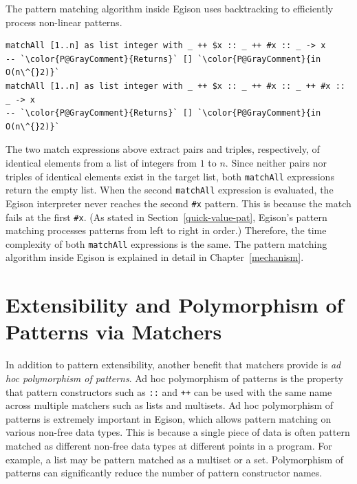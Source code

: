 The pattern matching algorithm inside Egison uses backtracking to efficiently process non-linear patterns.
\begin{lstlisting}[language=egison,numbers=none]
matchAll [1..n] as list integer with _ ++ $x :: _ ++ #x :: _ -> x
-- `\color{P@GrayComment}{Returns}` [] `\color{P@GrayComment}{in O(n\^{}2)}`
matchAll [1..n] as list integer with _ ++ $x :: _ ++ #x :: _ ++ #x :: _ -> x
-- `\color{P@GrayComment}{Returns}` [] `\color{P@GrayComment}{in O(n\^{}2)}`
\end{lstlisting}
The two match expressions above extract pairs and triples, respectively, of identical elements from a list of integers from $1$ to $n$.
Since neither pairs nor triples of identical elements exist in the target list, both \lstinline{matchAll} expressions return the empty list.
When the second \lstinline{matchAll} expression is evaluated, the Egison interpreter never reaches the second \lstinline|#x| pattern.
This is because the match fails at the first \lstinline|#x|.
(As stated in Section~\ref{quick-value-pat}, Egison's pattern matching processes patterns from left to right in order.)
Therefore, the time complexity of both \lstinline{matchAll} expressions is the same.
The pattern matching algorithm inside Egison is explained in detail in Chapter~\ref{mechanism}.

\section{Extensibility and Polymorphism of Patterns via Matchers}\label{quick-matcher}

In addition to pattern extensibility, another benefit that matchers provide is \emph{ad hoc polymorphism of patterns}.
Ad hoc polymorphism of patterns is the property that pattern constructors such as \lstinline{::} and \lstinline{++} can be used with the same name across multiple matchers such as lists and multisets.
Ad hoc polymorphism of patterns is extremely important in Egison, which allows pattern matching on various non-free data types.
This is because a single piece of data is often pattern matched as different non-free data types at different points in a program.
For example, a list may be pattern matched as a multiset or a set.
Polymorphism of patterns can significantly reduce the number of pattern constructor names.

